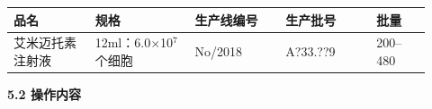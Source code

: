 \documentclass[UTF8,10pt,a4paper,fontset=fandol]{ctexart}
\newcommand{\fieldvalue}[1]{#1}
\newcommand{\handwritten}[1]{#1}
\begin{document}
\noindent
\begin{tabular}{|p{0.18\linewidth}|p{0.22\linewidth}|p{0.20\linewidth}|p{0.20\linewidth}|p{0.12\linewidth}|}
\hline
\centering 品名 & \centering 规格 & \centering 生产线编号 & \centering 生产批号 & \centering 批量\\
\hline
艾米迈托素注射液 &
12ml：6.0$\times$10$^{7}$个细胞 &
\fieldvalue{\handwritten{No/2018}} &
\fieldvalue{\handwritten{A?33.??9}} &
\fieldvalue{200--480}\\
\hline
\end{tabular}

\vspace{0.4em}

\noindent\textbf{5.2 操作内容}

\vspace{0.2em}
\end{document}
